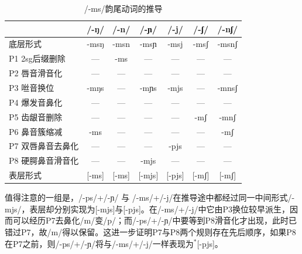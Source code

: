 \begin{table}[H]
\vspace{5pt}
    \centering
    \caption{/-ms/韵尾动词的推导}
    \label{deriv-ms}
\setlength{\tabcolsep}{4pt}\small
\begin{tabular}{l|cccccc}
\toprule
            & /-ŋ/ & /-n/ & /-ɲ/ & /-j/ & /-ʃ/ & /-nʃ/ \\
\midrule
底层形式 & -msŋ & -msn & -msɲ & -msj & -msʃ & -msnʃ \\
P1 2sg后缀删除 & --- & -ms & --- & --- & --- & --- \\
P2 唇音滑音化 & --- & --- & --- & --- & --- & --- \\
P3 咝音换位 & -mŋs & --- & -mɲs & -mjs & --- & -mnsʃ \\
P4 爆发音鼻化 & --- & --- & --- & --- & --- & --- \\
P5 齿龈音删除 & --- & --- & --- & --- & -mʃ & -mnʃ \\
P6 鼻音簇缩减 & -ms & --- & --- & --- & --- & -mʃ \\
P7 双唇鼻音去鼻化 & --- & --- & --- & -pjs & --- & --- \\
P8 硬腭鼻音滑音化 & --- & --- & -mjs & --- & --- & --- \\
\midrule
表层形式 & [-ms] & [-ms] & [-mjs] & [-pjs] & [-mʃ] & [-mʃ] \\
\bottomrule
\end{tabular}
\end{table}

值得注意的一组是，/-ps/+/-ɲ/ 与 /-ms/+/-j/在推导途中都经过同一中间形式/-mjs/，表层却分别实现为[-mjs]与[-pjs]。在/-ms/+/-j/中它由P3换位较早派生，因而可以经历P7去鼻化/m/变/p/；而/-ps/+/-ɲ/中要等到P8滑音化才出现，此时已错过P7，故/m/得以保留。这进一步证明P7与P8两个规则存在先后顺序，如果P8在P7之前，则/-ps/+/-ɲ/将与/-ms/+/-j/一样表现为$^*$[-pjs]。

